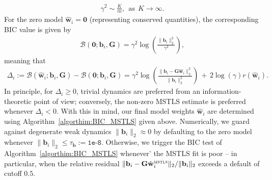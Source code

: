 \documentclass[journal=gmj]{CUP-JNL-DTM}%
\theoremstyle{definition}
\numberwithin{equation}{section}
\begin{document}
\begin{appendix}
\begin{align*}
    \gamma^2 \sim \frac{K}{m},
    \ \ \text{as} \ \
    K \rightarrow \infty.
\end{align*} For the zero model $\hat{\mathbf{w}}_i = \mathbf{0}$ (representing conserved quantities), the corresponding BIC value is given by \begin{align*}
    \mathcal{B}(\mathbf{0}; \mathbf{b}_i, \mathbf{G}) = \gamma^2 \log\left( \frac{\|\mathbf{b}_i\|^2_2}{\gamma^2} \right),
\end{align*} meaning that \begin{align*}
    \Delta_i := \mathcal{B}(\hat{\mathbf{w}}_i; \mathbf{b}_i, \mathbf{G}) - \mathcal{B}(\mathbf{0}; \mathbf{b}_i, \mathbf{G})
    = \gamma^2\log\left(\frac{\|\mathbf{b}_i - \mathbf{G}\hat{\mathbf{w}}_i\|^2_2}{\|\mathbf{b}_i\|^2_2}\right) \, + \, 2\log(\gamma)r(\hat{\mathbf{w}}_i).
\end{align*} In principle, for $\Delta_i \geq 0$, trivial dynamics are preferred from an information-theoretic point of view; conversely, the non-zero MSTLS estimate is preferred whenever $\Delta_i < 0$. With this in mind, our final model weights $\hat{\mathbf{w}}_i$ are determined using Algorithm~\ref{algorthim:BIC_MSTLS} given above. Numerically, we guard against degenerate weak dynamics $\|\mathbf{b}_i\|_2 \approx 0$ by defaulting to the zero model whenever $\|\mathbf{b}_i\|_2 \leq \tau_{\mathbf{b}} := \texttt{1e-8}$. Otherwise, we trigger the BIC test of Algorithm~\ref{algorthim:BIC_MSTLS} whenever' the MSTLS fit is poor -- in particular, when the relative residual $\|\mathbf{b}_i - \mathbf{G}\hat{\mathbf{w}}_i^{\textsc{mstls}}\|_2 / \|\mathbf{b}_i\|_2$ exceeds a default of cutoff $0.5$.



\newpage



\end{appendix}
\end{document}
